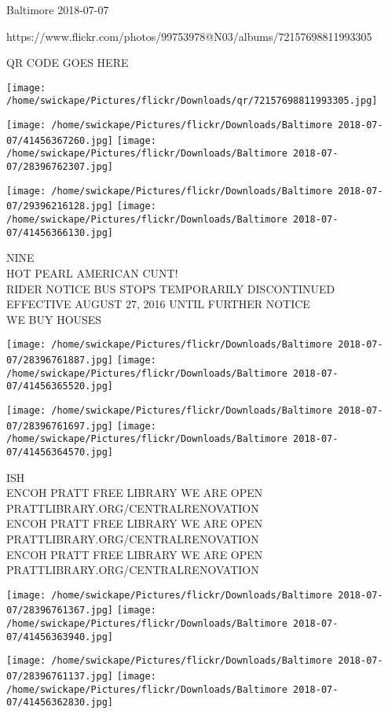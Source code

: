 \documentclass[10pt,letterpaper]{article}
\begin{document}
Baltimore 2018-07-07

https://www.flickr.com/photos/99753978@N03/albums/72157698811993305

QR CODE GOES HERE

\texttt{[image: /home/swickape/Pictures/flickr/Downloads/qr/72157698811993305.jpg]}
\pagebreak

\texttt{[image: /home/swickape/Pictures/flickr/Downloads/Baltimore 2018-07-07/41456367260.jpg]}
\texttt{[image: /home/swickape/Pictures/flickr/Downloads/Baltimore 2018-07-07/28396762307.jpg]}

\texttt{[image: /home/swickape/Pictures/flickr/Downloads/Baltimore 2018-07-07/29396216128.jpg]}
\texttt{[image: /home/swickape/Pictures/flickr/Downloads/Baltimore 2018-07-07/41456366130.jpg]}

NINE\\
HOT PEARL AMERICAN CUNT!\\
RIDER NOTICE BUS STOPS TEMPORARILY DISCONTINUED EFFECTIVE AUGUST 27, 2016 UNTIL FURTHER NOTICE\\
WE BUY HOUSES\\
\pagebreak

\texttt{[image: /home/swickape/Pictures/flickr/Downloads/Baltimore 2018-07-07/28396761887.jpg]}
\texttt{[image: /home/swickape/Pictures/flickr/Downloads/Baltimore 2018-07-07/41456365520.jpg]}

\texttt{[image: /home/swickape/Pictures/flickr/Downloads/Baltimore 2018-07-07/28396761697.jpg]}
\texttt{[image: /home/swickape/Pictures/flickr/Downloads/Baltimore 2018-07-07/41456364570.jpg]}

ISH\\
ENCOH PRATT FREE LIBRARY WE ARE OPEN PRATTLIBRARY.ORG/CENTRALRENOVATION\\
ENCOH PRATT FREE LIBRARY WE ARE OPEN PRATTLIBRARY.ORG/CENTRALRENOVATION\\
ENCOH PRATT FREE LIBRARY WE ARE OPEN PRATTLIBRARY.ORG/CENTRALRENOVATION\\
\pagebreak

\texttt{[image: /home/swickape/Pictures/flickr/Downloads/Baltimore 2018-07-07/28396761367.jpg]}
\texttt{[image: /home/swickape/Pictures/flickr/Downloads/Baltimore 2018-07-07/41456363940.jpg]}

\texttt{[image: /home/swickape/Pictures/flickr/Downloads/Baltimore 2018-07-07/28396761137.jpg]}
\texttt{[image: /home/swickape/Pictures/flickr/Downloads/Baltimore 2018-07-07/41456362830.jpg]}
\end{document}
